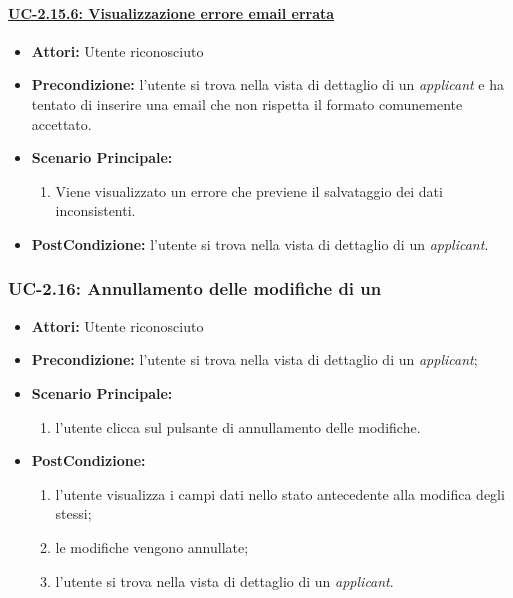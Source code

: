 \paragraph{\underline{UC-2.15.6: Visualizzazione errore email errata}}
\begin{itemize}	
	\item \textbf{Attori:} Utente riconosciuto
	\item \textbf{Precondizione:}  l'utente si trova nella vista di dettaglio di un \textit{applicant} e ha tentato di inserire una email che non rispetta il formato comunemente accettato.
	\item \textbf{Scenario Principale:}
	\begin{enumerate}
		\item Viene visualizzato un errore che previene il salvataggio dei dati inconsistenti.
	\end{enumerate}
	\item \textbf{PostCondizione:} l'utente si trova nella vista di dettaglio di un \textit{applicant}.
\end{itemize}


\subsubsection{UC-2.16: Annullamento delle modifiche di un \applicant}
\begin{itemize}
	\item \textbf{Attori:} Utente riconosciuto
	\item \textbf{Precondizione:}  l'utente si trova nella vista di dettaglio di un \textit{applicant};
	\item \textbf{Scenario Principale:}
	\begin{enumerate}
		\item l'utente clicca sul pulsante di annullamento delle modifiche.
	\end{enumerate}
	\item \textbf{PostCondizione:} 
	\begin{enumerate}
		\item l'utente visualizza i campi dati nello stato antecedente alla modifica degli stessi;
		\item le modifiche vengono annullate;
		\item l'utente si trova nella vista di dettaglio di un \textit{applicant}.
	\end{enumerate}
	
\end{itemize}



